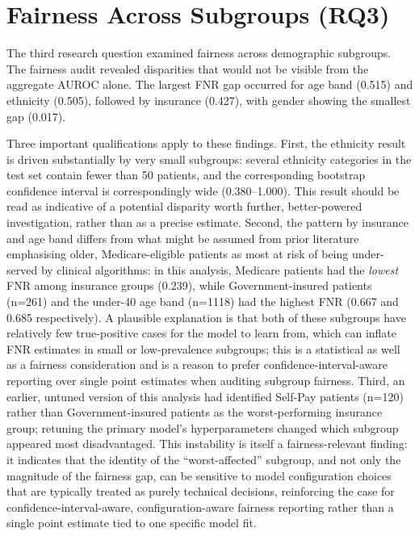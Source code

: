 \documentclass[12pt,a4paper]{report}
\begin{document}
\section{Fairness Across Subgroups (RQ3)}
The third research question examined fairness across demographic subgroups. The fairness audit revealed disparities that would not be visible from the aggregate AUROC alone. The largest FNR gap occurred for age band (0.515) and ethnicity (0.505), followed by insurance (0.427), with gender showing the smallest gap (0.017).

Three important qualifications apply to these findings. First, the ethnicity result is driven substantially by very small subgroups: several ethnicity categories in the test set contain fewer than 50 patients, and the corresponding bootstrap confidence interval is correspondingly wide (0.380--1.000). This result should be read as indicative of a potential disparity worth further, better-powered investigation, rather than as a precise estimate. Second, the pattern by insurance and age band differs from what might be assumed from prior literature emphasising older, Medicare-eligible patients as most at risk of being under-served by clinical algorithms: in this analysis, Medicare patients had the \emph{lowest} FNR among insurance groups (0.239), while Government-insured patients (n=261) and the under-40 age band (n=1118) had the highest FNR (0.667 and 0.685 respectively). A plausible explanation is that both of these subgroups have relatively few true-positive cases for the model to learn from, which can inflate FNR estimates in small or low-prevalence subgroups; this is a statistical as well as a fairness consideration and is a reason to prefer confidence-interval-aware reporting over single point estimates when auditing subgroup fairness. Third, an earlier, untuned version of this analysis had identified Self-Pay patients (n=120) rather than Government-insured patients as the worst-performing insurance group; retuning the primary model's hyperparameters changed which subgroup appeared most disadvantaged. This instability is itself a fairness-relevant finding: it indicates that the identity of the ``worst-affected'' subgroup, and not only the magnitude of the fairness gap, can be sensitive to model configuration choices that are typically treated as purely technical decisions, reinforcing the case for confidence-interval-aware, configuration-aware fairness reporting rather than a single point estimate tied to one specific model fit.
\end{document}
